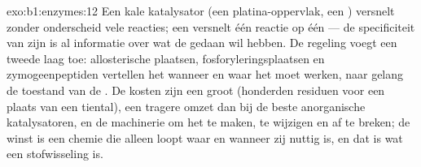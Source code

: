\begin{solution}{exo:b1:enzymes:12}
Een kale katalysator (een platina-oppervlak, een ) versnelt zonder onderscheid
vele reacties; een  versnelt één reactie op één  --- de specificiteit
van zijn  is al informatie over wat de  gedaan wil hebben. De
regeling voegt een tweede laag toe: allosterische plaatsen, fosforyleringsplaatsen
en zymogeenpeptiden vertellen het  wanneer en waar het moet werken, naar
gelang de toestand van de . De kosten zijn een groot  (honderden residuen
voor een plaats van een tiental), een tragere omzet dan bij de beste anorganische
katalysatoren, en de machinerie om het te maken, te wijzigen en af te breken; de
winst is een chemie die alleen loopt waar en wanneer zij nuttig is, en dat is wat
een stofwisseling is.
\end{solution}

